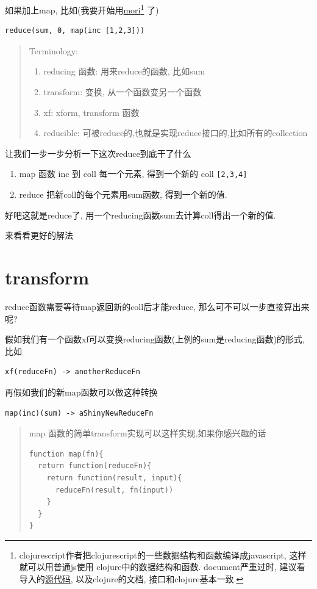 \documentclass[a5paper]{book}
\begin{document}
如果加上map, 比如(我要开始用\href{https://github.com/swannodette/mori}{mori}\footnote{clojurescript作者把clojurescript的一些数据结构和函数编译成javascript, 这样就可以用普通js使用
clojure中的数据结构和函数. document严重过时, 建议看导入的\href{https://github.com/swannodette/mori/blob/master/src/mori.cljs}{源代码}, 以及clojure的文档, 接口和clojure基本一致.} 了)
\begin{verbatim}
reduce(sum, 0, map(inc [1,2,3]))
\end{verbatim}

\begin{quote}
Terminology:
\begin{enumerate}
\item reducing 函数: 用来reduce的函数, 比如sum
\item transform: 变换, 从一个函数变另一个函数
\item xf: xform, transform 函数
\item reducible: 可被reduce的,也就是实现reduce接口的,比如所有的collection
\end{enumerate}
\end{quote}

让我们一步一步分析一下这次reduce到底干了什么
\begin{enumerate}
\item map 函数 inc 到 coll 每一个元素, 得到一个新的 coll \texttt{[2,3,4]}
\item reduce 把新coll的每个元素用sum函数, 得到一个新的值.
\end{enumerate}

好吧这就是reduce了, 用一个reducing函数sum去计算coll得出一个新的值.

来看看更好的解法
\section{transform}
\label{sec:orgheadline24}
reduce函数需要等待map返回新的coll后才能reduce, 那么可不可以一步直接算出来呢?

假如我们有一个函数xf可以变换reducing函数(上例的sum是reducing函数)的形式, 比如
\begin{verbatim}
xf(reduceFn) -> anotherReduceFn
\end{verbatim}

再假如我们的新map函数可以做这种转换
\begin{verbatim}
map(inc)(sum) -> aShinyNewReduceFn
\end{verbatim}

\begin{quote}
map 函数的简单transform实现可以这样实现,如果你感兴趣的话
\begin{verbatim}
function map(fn){
  return function(reduceFn){
    return function(result, input){
      reduceFn(result, fn(input))
    }
  }
}
\end{verbatim}
\end{quote}
\end{document}
